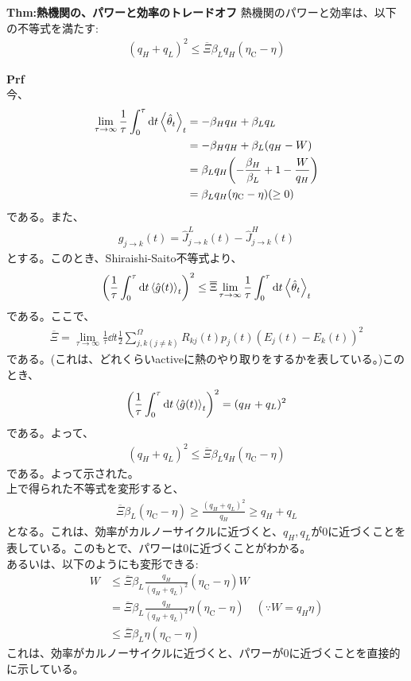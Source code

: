 \documentclass[a4paper,11pt]{jsarticle}
\numberwithin{equation}{section}
\begin{document}
\begin{itembox}[l]{\textbf{Thm:熱機関の、パワーと効率のトレードオフ}}
    熱機関のパワーと効率は、以下の不等式を満たす:
    \begin{align}
      (q_H + q_L)^2 \leq \overline{\Xi} \beta_L q_H (\eta_{\text{C}} - \eta) 
    \end{align}

\end{itembox}
\textbf{Prf}\\
今、
\begin{align}
    \lim_{\tau \to \infty}\frac{1}{\tau}\int_0^{\tau} \dd{t}\ev{\hat{\theta}_t}_t &= -\beta_H q_H + \beta_L q_L\\
    &= -\beta_H q_H + \beta_L (q_H - W)\\
    &= \beta_L q_H \qty(-\frac{\beta_H}{\beta_L} + 1 - \frac{W}{q_H})\\
      &= \beta_L q_H (\eta_{\text{C}} - \eta) (\geq 0)
  \end{align}
  である。また、
\begin{align}
  g_{j \to k}(t) = \hat{J}_{j \to k}^L(t) - \hat{J}_{j \to k}^H(t)
\end{align}
とする。このとき、Shiraishi-Saito不等式より、
\begin{align}
  \left(\frac{1}{\tau}\int_0^{\tau} \dd{t}\ev{\hat{g}(t)}_t\right)^2 \leq \overline{\Xi} \lim_{\tau \to \infty}\frac{1}{\tau}\int_0^{\tau} \dd{t}\ev{\hat{\theta}_t}_t
\end{align}
である。ここで、
\begin{align}
  \overline{\Xi} = \lim_{\tau \to \infty}\frac{1}{\tau} \dd{t} \frac{1}{2}\sum_{j,k(j \neq k)}^{\Omega} R_{kj}(t)p_j(t) (E_j(t) - E_k(t))^2
\end{align}
である。(これは、どれくらいactiveに熱のやり取りをするかを表している。)このとき、
\begin{align}
  \qty(\frac{1}{\tau}\int_0^{\tau} \dd{t}\ev{\hat{g}(t)}_t)^2 = (q_H + q_L)^2
\end{align}
である。よって、
\begin{align}
  (q_H + q_L)^2 \leq \overline{\Xi} \beta_L q_H (\eta_{\text{C}} - \eta)
\end{align}
である。よって示された。\qedsymbol\\

上で得られた不等式を変形すると、
\begin{align}
  \overline{\Xi} \beta_L(\eta_{\text{C}} - \eta) \geq \frac{(q_H + q_L)^2}{q_H} \geq q_H + q_L
\end{align}
となる。これは、効率がカルノーサイクルに近づくと、$q_H, q_L$が0に近づくことを表している。このもとで、パワーは0に近づくことがわかる。\\
あるいは、以下のようにも変形できる:
\begin{align}
  W &\leq \overline{\Xi} \beta_L\frac{q_H}{(q_H + q_L)^2}(\eta_{\text{C}} - \eta)W\\
  &= \overline{\Xi} \beta_L\frac{q_H}{(q_H + q_L)^2}\eta(\eta_{\text{C}} - \eta)\quad (\because W = q_H \eta)\\
    &\leq \overline{\Xi} \beta_L\eta(\eta_{\text{C}} - \eta)
\end{align}
これは、効率がカルノーサイクルに近づくと、パワーが0に近づくことを直接的に示している。\\
\end{document}
